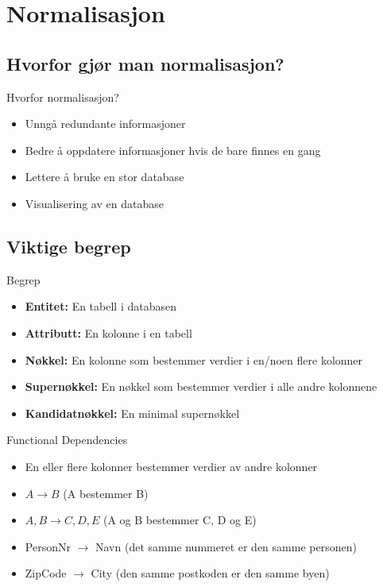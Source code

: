 \section{Normalisasjon}
\subsection*{Hvorfor gjør man normalisasjon?}
\begin{frame}{Hvorfor normalisasjon?}
\begin{itemize}[<+->]
    \item Unngå redundante informasjoner
    \item Bedre å oppdatere informasjoner hvis de bare finnes en gang
    \item Lettere å bruke en stor database
    \item Visualisering av en database
\end{itemize}
\end{frame}

\subsection*{Viktige begrep}
\begin{frame}{Begrep}
\begin{itemize}[<+->]
    \item \textbf{Entitet: }En tabell i databasen
    \item \textbf{Attributt: }En kolonne i en tabell
    \item \textbf{Nøkkel: }En kolonne som bestemmer verdier i en/noen flere kolonner 
    \item \textbf{Supernøkkel: }En nøkkel som bestemmer verdier i alle andre kolonnene 
    \item \textbf{Kandidatnøkkel: }En minimal supernøkkel
\end{itemize}
\end{frame}

\begin{frame}{Functional Dependencies}
\begin{itemize}[<+->]
    \item En eller flere kolonner bestemmer verdier av andre kolonner
    \item $A \rightarrow B$ (A bestemmer B)
    \item $A,B \rightarrow C, D, E$ (A og B bestemmer C, D og E)
    \item PersonNr $\rightarrow$ Navn (det samme nummeret er den samme personen)
    \item ZipCode $\rightarrow$ City (den samme postkoden er den samme byen)
\end{itemize}
\end{frame}

